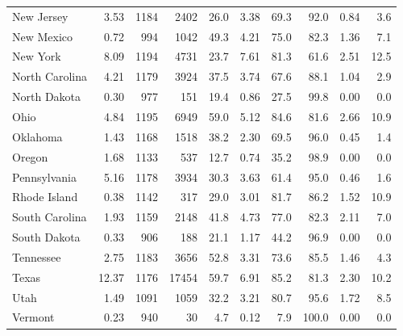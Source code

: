 \begin{tabular}{lrrrrrrrrr}
New Jersey & \num{3.53} & \num{1184} & \num{2402} & \num{26.0} & \num{3.38} & \num{69.3} & \num{92.0} & \num{0.84} & \num{3.6} \\
New Mexico & \num{0.72} & \num{994} & \num{1042} & \num{49.3} & \num{4.21} & \num{75.0} & \num{82.3} & \num{1.36} & \num{7.1} \\
New York & \num{8.09} & \num{1194} & \num{4731} & \num{23.7} & \num{7.61} & \num{81.3} & \num{61.6} & \num{2.51} & \num{12.5} \\
North Carolina & \num{4.21} & \num{1179} & \num{3924} & \num{37.5} & \num{3.74} & \num{67.6} & \num{88.1} & \num{1.04} & \num{2.9} \\
North Dakota & \num{0.30} & \num{977} & \num{151} & \num{19.4} & \num{0.86} & \num{27.5} & \num{99.8} & \num{0.00} & \num{0.0} \\
Ohio & \num{4.84} & \num{1195} & \num{6949} & \num{59.0} & \num{5.12} & \num{84.6} & \num{81.6} & \num{2.66} & \num{10.9} \\
Oklahoma & \num{1.43} & \num{1168} & \num{1518} & \num{38.2} & \num{2.30} & \num{69.5} & \num{96.0} & \num{0.45} & \num{1.4} \\
Oregon & \num{1.68} & \num{1133} & \num{537} & \num{12.7} & \num{0.74} & \num{35.2} & \num{98.9} & \num{0.00} & \num{0.0} \\
Pennsylvania & \num{5.16} & \num{1178} & \num{3934} & \num{30.3} & \num{3.63} & \num{61.4} & \num{95.0} & \num{0.46} & \num{1.6} \\
Rhode Island & \num{0.38} & \num{1142} & \num{317} & \num{29.0} & \num{3.01} & \num{81.7} & \num{86.2} & \num{1.52} & \num{10.9} \\
South Carolina & \num{1.93} & \num{1159} & \num{2148} & \num{41.8} & \num{4.73} & \num{77.0} & \num{82.3} & \num{2.11} & \num{7.0} \\
South Dakota & \num{0.33} & \num{906} & \num{188} & \num{21.1} & \num{1.17} & \num{44.2} & \num{96.9} & \num{0.00} & \num{0.0} \\
Tennessee & \num{2.75} & \num{1183} & \num{3656} & \num{52.8} & \num{3.31} & \num{73.6} & \num{85.5} & \num{1.46} & \num{4.3} \\
Texas & \num{12.37} & \num{1176} & \num{17454} & \num{59.7} & \num{6.91} & \num{85.2} & \num{81.3} & \num{2.30} & \num{10.2} \\
Utah & \num{1.49} & \num{1091} & \num{1059} & \num{32.2} & \num{3.21} & \num{80.7} & \num{95.6} & \num{1.72} & \num{8.5} \\
Vermont & \num{0.23} & \num{940} & \num{30} & \num{4.7} & \num{0.12} & \num{7.9} & \num{100.0} & \num{0.00} & \num{0.0} \\

\end{tabular}

